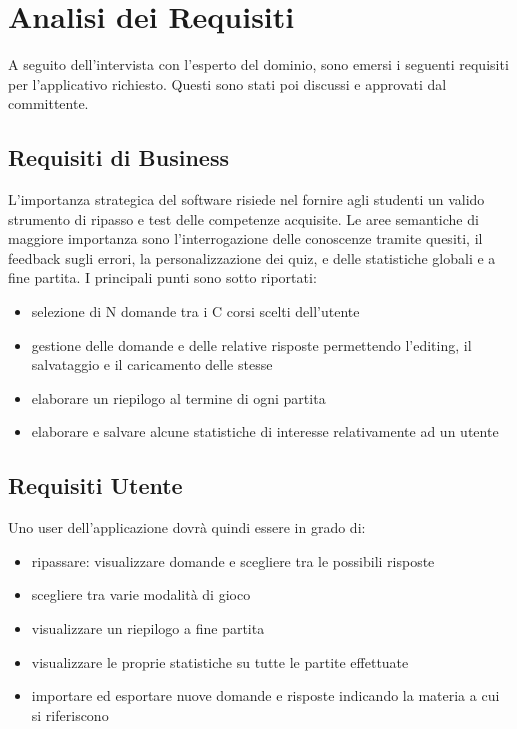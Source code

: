 

\chapter{Analisi dei Requisiti}
A seguito dell'intervista con l'esperto del dominio, sono emersi i seguenti requisiti per l'applicativo richiesto. Questi sono stati poi discussi e approvati dal committente.
\section{Requisiti di Business}
    L'importanza strategica del software risiede nel fornire agli studenti un valido strumento di ripasso e test delle competenze acquisite.
    Le aree semantiche di maggiore importanza sono l'interrogazione delle conoscenze tramite quesiti, il feedback sugli errori, la personalizzazione dei quiz, e delle statistiche globali e a fine partita. 
    I principali punti sono sotto riportati:
    \begin{itemize}
        \item selezione di N domande tra i C corsi scelti dell'utente
        \item gestione delle domande e delle relative risposte permettendo l'editing, il salvataggio e il caricamento delle stesse
        \item elaborare un riepilogo al termine di ogni partita
        \item elaborare e salvare alcune statistiche di interesse relativamente ad un utente
    \end{itemize}
	
\section{Requisiti Utente}
    Uno user dell'applicazione dovrà quindi essere in grado di:
    \begin{itemize}
        \item ripassare: visualizzare domande e scegliere tra le possibili risposte
        \item scegliere tra varie modalità di gioco
        \item visualizzare un riepilogo a fine partita
        \item visualizzare le proprie statistiche su tutte le partite effettuate
        \item importare ed esportare nuove domande e risposte indicando la materia a cui si riferiscono
    \end{itemize}
 
